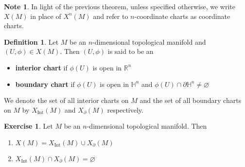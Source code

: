 \documentclass{book}
\theoremstyle{definition}
\newtheorem{defn}[definition]{Definition}
\newtheorem{note}[definition]{Note}
\newtheorem{ex}[definition]{Exercise}
\renewcommand{\H}{\mathbb{H}}
\newcommand{\R}{\mathbb{R}}
\DeclareMathOperator{\Int}{Int}
\DeclareMathOperator*{\0}{\mbf{0}}
\DeclareMathOperator*{\1}{\mbf{1}}
\newcommand{\p}{\partial}
\begin{document}
	\begin{note}
		In light of the previous theorem, unless specified otherwise, we write $X(M)$ in place of $X^n(M)$ and refer to $n$-coordinate charts as coordinate charts.
	\end{note}

	\begin{defn}
		Let $M$ be an $n$-dimensional topological manifold and $(U, \phi) \in X(M)$. Then $(U, \phi)$ is said to be an
		\begin{itemize}
			\item \textbf{interior chart} if $\phi(U)$ is open in $\R^n$ 
			\item \textbf{boundary chart} if $\phi(U)$ is open in $\H^n$ and $\phi(U) \cap \p \H^n \neq \varnothing$
		\end{itemize}
		We denote the set of all interior charts on $M$ and the set of all boundary charts on $M$ by $X_{\Int}(M)$ and $X_{\p}(M)$ respectively. 
	\end{defn}

	\begin{ex}
		Let $M$ be an $n$-dimensional topological manifold. Then 
		\begin{enumerate}
			\item $X(M) = X_{\Int}(M) \cup X_{\p}(M)$
			\item $X_{\Int}(M) \cap X_{\p}(M) = \varnothing$
		\end{enumerate}
	\end{ex}
\end{document}
